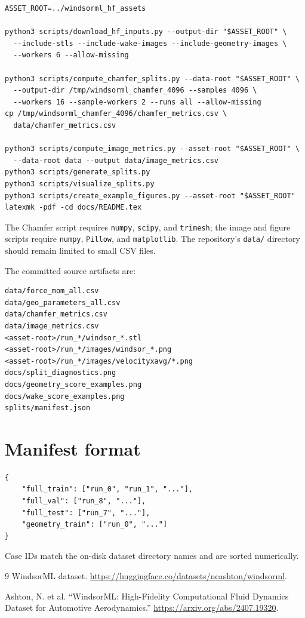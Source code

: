 \documentclass[10pt]{article}
\newcommand{\code}[1]{\texttt{#1}}
\begin{document}
\begin{verbatim}
ASSET_ROOT=../windsorml_hf_assets

python3 scripts/download_hf_inputs.py --output-dir "$ASSET_ROOT" \
  --include-stls --include-wake-images --include-geometry-images \
  --workers 6 --allow-missing

python3 scripts/compute_chamfer_splits.py --data-root "$ASSET_ROOT" \
  --output-dir /tmp/windsorml_chamfer_4096 --samples 4096 \
  --workers 16 --sample-workers 2 --runs all --allow-missing
cp /tmp/windsorml_chamfer_4096/chamfer_metrics.csv \
  data/chamfer_metrics.csv

python3 scripts/compute_image_metrics.py --asset-root "$ASSET_ROOT" \
  --data-root data --output data/image_metrics.csv
python3 scripts/generate_splits.py
python3 scripts/visualize_splits.py
python3 scripts/create_example_figures.py --asset-root "$ASSET_ROOT"
latexmk -pdf -cd docs/README.tex
\end{verbatim}

The Chamfer script requires \code{numpy}, \code{scipy}, and \code{trimesh}; the
image and figure scripts require \code{numpy}, \code{Pillow}, and
\code{matplotlib}. The repository's \code{data/} directory should remain limited
to small CSV files.

The committed source artifacts are:

\begin{verbatim}
data/force_mom_all.csv
data/geo_parameters_all.csv
data/chamfer_metrics.csv
data/image_metrics.csv
<asset-root>/run_*/windsor_*.stl
<asset-root>/run_*/images/windsor_*.png
<asset-root>/run_*/images/velocityxavg/*.png
docs/split_diagnostics.png
docs/geometry_score_examples.png
docs/wake_score_examples.png
splits/manifest.json
\end{verbatim}

\section*{Manifest format}

\begin{verbatim}
{
    "full_train": ["run_0", "run_1", "..."],
    "full_val": ["run_8", "..."],
    "full_test": ["run_7", "..."],
    "geometry_train": ["run_0", "..."]
}
\end{verbatim}

Case IDs match the on-disk dataset directory names and are sorted numerically.

{\small
\begin{thebibliography}{9}
WindsorML dataset. \url{https://huggingface.co/datasets/neashton/windsorml}.

Ashton, N. et al. ``WindsorML: High-Fidelity Computational Fluid Dynamics Dataset for Automotive Aerodynamics.'' \url{https://arxiv.org/abs/2407.19320}.
\end{thebibliography}
}
\end{document}
